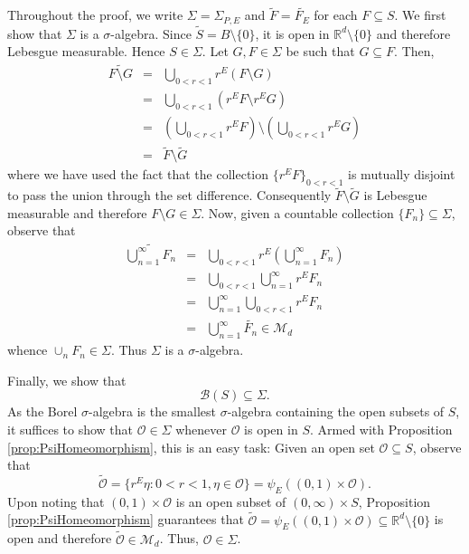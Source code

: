 \documentclass[smallextended]{svjour3}
\theoremstyle{remark}
\renewenvironment{proof}[1][\proofname]{\renewcommand\xproofname{#1}\xproof}{\endxproof}
\begin{document}
\begin{proof}
Throughout the proof, we write $\Sigma=\Sigma_{P,E}$ and $\widetilde{F}=\widetilde{F_E}$ for each $F\subseteq S$.
We first show that $\Sigma$ is a $\sigma$-algebra. Since $\widetilde S=B\setminus\{0\}$, it is open in $\mathbb{R}^d\setminus\{0\}$ and therefore Lebesgue measurable. Hence $S\in \Sigma$. Let $G, F\in \Sigma$ be such that $G\subseteq F$. Then,
\begin{eqnarray*}
\widetilde{F\setminus G} &=& \bigcup_{0<r<1}r^E\left(F\setminus G\right)\\
& =&\bigcup_{0<r<1}\left(r^EF\setminus r^E G\right)\\
&=&\left(\bigcup_{0<r<1}r^E F\right)\setminus\left(\bigcup_{0<r<1}r^E G\right)\\
&=&\widetilde F\setminus \widetilde G
\end{eqnarray*}
where we have used the fact that the collection $\{r^E F\}_{0<r<1}$ is mutually disjoint to pass the union through the set difference. Consequently $\widetilde F\setminus \widetilde{G}$ is Lebesgue measurable and therefore $F\setminus G\in \Sigma$.  Now, given a countable collection $\{F_n\}\subseteq \Sigma$, observe that
\begin{eqnarray*}
    \widetilde{\bigcup_{n=1}^\infty F_n} &=& \bigcup_{0<r<1}r^E \left(\bigcup_{n=1}^\infty F_n\right)  \\
    &=&\bigcup_{0 <r< 1}  \bigcup_{n=1}^\infty  r^E F_n\\
    &=&\bigcup_{n=1}^\infty \bigcup_{0 <r < 1}  r^E F_n\\
    &=&\bigcup_{n=1}^\infty \widetilde{F_n} \in \mathcal{M}_d
\end{eqnarray*}
whence $\cup_n F_n\in \Sigma$. Thus $\Sigma$ is a $\sigma$-algebra. 

Finally, we show that
\begin{equation*}
\mathcal{B}(S)\subseteq\Sigma.
\end{equation*}
As the Borel $\sigma$-algebra is the smallest $\sigma$-algebra containing the open subsets of $S$, it suffices to show that $\mathcal{O}\in \Sigma$ whenever $\mathcal{O}$ is open in $S$. Armed with Proposition \ref{prop:PsiHomeomorphism}, this is an easy task: Given an open set $\mathcal{O}\subseteq S$, observe that
\begin{equation*}
\widetilde{\mathcal{O}}=\{r^E\eta:0<r<1,\eta\in\mathcal{O}\}=\psi_E((0,1)\times\mathcal{O}).
\end{equation*}
Upon noting that $(0,1)\times\mathcal{O}$ is an open subset of $(0,\infty)\times S$, Proposition \ref{prop:PsiHomeomorphism} guarantees that $\widetilde{\mathcal{O}}=\psi_E((0,1)\times\mathcal{O})\subseteq\mathbb{R}^d\setminus\{0\}$ is open and therefore $\widetilde{\mathcal{O}} \in \mathcal{M}_d$. Thus, $\mathcal{O}\in \Sigma$.
\end{proof}
\end{document}
